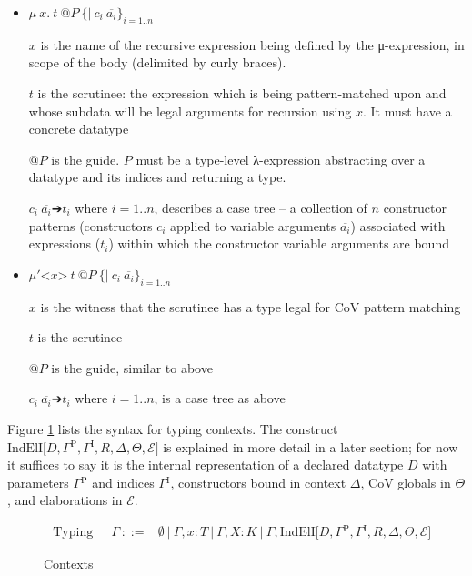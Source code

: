 \documentclass{article}
\makeatletter
\newcommand{\ann}[2]{#1\! : \! #2}
\newcommand{\splab}[1]{\ensuremath{^{\text{#1}}}}
\newcommand{\indeli}[7]{\ensuremath{\text{IndElI[}#1,#2,#3,#4,#5,#6,#7\text{]}}}
\newcommand{\vars}[1]{{\overline{#1}}}
\newcommand{\mufix}[4]{\ensuremath{μ\ #1.\ #2\ @#3\ \{\texttt{|}\ #4\}}}
\newcommand{\mumat}[4]{\ensuremath{μ'\texttt{<$#1$>}\ #2\ @#3\ \{\texttt{|}\ #4\}}}
\makeatother
\begin{document}
\begin{itemize}
\item \(\mufix{x}{t}{P}{c_i\ \vars{a_i}}_{i=1..n}\)

  $x$ is the name of the recursive expression being defined by the μ-expression,
  in scope of the body (delimited by curly braces).

  $t$ is the scrutinee: the expression which is being pattern-matched upon and
  whose subdata will be legal arguments for recursion using $x$. It must have a
  concrete datatype

  $@P$ is the guide. $P$ must be a type-level λ-expression abstracting over a
  datatype and its indices and returning a type.
  
  $c_i\ \vars{a_i} ➔ t_i$ where $i=1..n$, describes a case tree -- a collection
  of $n$ constructor patterns (constructors $c_i$ applied to variable arguments $\vars{a_i}$)
  associated with expressions ($t_i$) within which the constructor variable
  arguments are bound
\item \(\mumat{x}{t}{P}{c_i\ \vars{a_i}}_{i=1..n}\)

  $x$ is the witness that the scrutinee has a type legal for CoV pattern
  matching

  $t$ is the scrutinee

  $@P$ is the guide, similar to above

  $c_i\ \vars{a_i} ➔ t_i$ where $i=1..n$, is a case tree as above
\end{itemize}

Figure \ref{fig:contexts} lists the syntax for typing contexts. The construct
\(\indeli{D}{\Gamma\splab{P}}{\Gamma\splab{I}}{R}{\Delta}{\Theta}{\mathcal{E}}\) is explained in more detail in a
later section; for now it suffices to say it is the internal representation of a
declared datatype $D$ with parameters $\Gamma\splab{P}$ and indices
$\Gamma\splab{I}$, constructors bound in context $\Delta$, CoV globals in
$\Theta$, and elaborations in $\mathcal{E}$.

\begin{figure}[htbp!]
  \[
    \begin{array}{llll}
      \text{ Typing contexts } \Gamma
      & ::= & \emptyset\ |\ \Gamma,\ann{x}{T}\ %
              |\ \Gamma,\ann{X}{K}\
              |\ \Gamma,\indeli{D}{\Gamma\splab{P}}{\Gamma\splab{I}}{R}{\Delta}{\Theta}{\mathcal{E}}
    \end{array}
  \]
  \caption{Contexts}
  \label{fig:contexts}
\end{figure}
\end{document}
